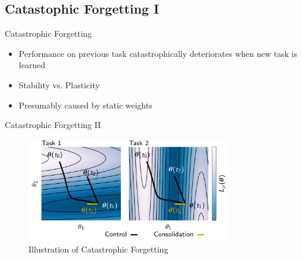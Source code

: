 \documentclass{beamer}
\begin{document}
\subsection{Catastophic Forgetting I}
\begin{frame}{Catastrophic Forgetting}
	\begin{itemize}
		\item<1-> Performance on previous task catastrophically deteriorates when new task is learned
		\item<2-> Stability vs. Plasticity	
		\item<3-> Presumably caused by static weights
\end{itemize}
\begin{center}
\end{center}
\end{frame}

\begin{frame}{Catastrophic Forgetting II}
	\begin{figure}
	
	\centering
	\includegraphics[width=0.8\textwidth]{ML1}
	\caption{Illustration of Catastrophic Forgetting \cite{zenke2017continual}}
\end{figure}
\end{frame}
\end{document}
